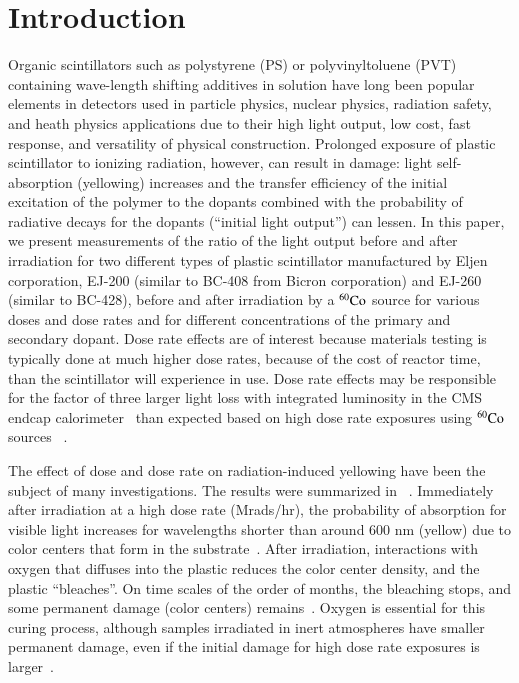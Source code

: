 \documentclass[review]{elsarticle}
\begin{document}
\section{Introduction}
Organic scintillators such as polystyrene (PS) or polyvinyltoluene (PVT)
containing wave-length shifting
additives in solution have long been popular elements in detectors used
in particle physics, nuclear physics, radiation safety, and heath physics applications  due to their high light output, low cost, fast response,
and versatility of physical construction. 
Prolonged exposure of plastic scintillator to
ionizing radiation, however, can result in damage:
light self-absorption (yellowing) increases and
the transfer efficiency of the initial excitation of the polymer to the
dopants combined with the probability of radiative decays for the dopants (``initial light output'') can lessen.  
In this paper, we present measurements of the ratio of the light output before and after irradiation
for two different types of plastic scintillator manufactured by Eljen corporation, EJ-200 (similar to BC-408 from Bicron corporation) and EJ-260 (similar to BC-428), before and after irradiation by a $\rm {^{60}Co}$ source for various doses and dose rates and for different concentrations of the primary and secondary dopant.
Dose rate effects are of interest because materials testing is typically done at much higher dose rates, because of the cost of reactor time, than the scintillator will experience in use.  Dose rate effects may be responsible for the
factor of three larger light loss with integrated luminosity 
in the CMS endcap calorimeter~\cite{phaseiitdr,ecfa2015}
than expected based
on high dose rate exposures using ${\rm ^{60}Co}$ sources ~\cite{vasken,ByonWagner1993263}.

The effect of dose and dose rate on radiation-induced yellowing have been the subject of many investigations. The results were summarized in ~\cite{sauli}.  
Immediately after irradiation at a high dose rate (Mrads/hr), 
the probability of absorption for visible light increases for wavelengths shorter than around 600 nm (yellow) due to color centers that form in the substrate~\cite{Bross199135}.  
After irradiation, interactions with oxygen that diffuses into the plastic reduces the color center density, and the plastic ``bleaches''.  On time scales of the order of months, the bleaching stops, and some permanent damage (color centers) remains~\cite{sauli}.
Oxygen is essential for this curing process, although samples irradiated in inert atmospheres have smaller permanent damage, even if the initial damage for high dose rate exposures is larger~\cite{zorn2}.  
\end{document}
